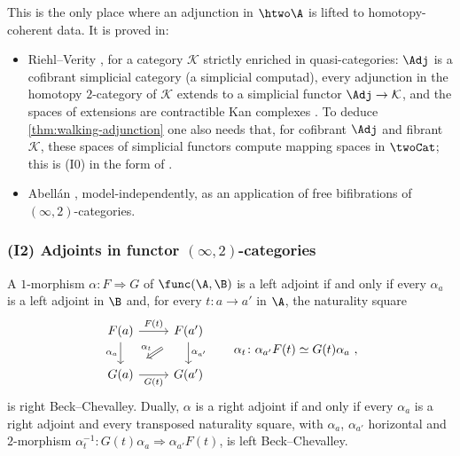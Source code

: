 This is the only place where an adjunction in $\htwo\A$ is lifted to homotopy-coherent data. It is proved in:
\begin{itemize}
\item Riehl--Verity \cite{riehlverity2016adjunctions}, for a category $\mathcal{K}$ strictly enriched in quasi-categories: $\Adj$ is a cofibrant simplicial category (a simplicial computad), every adjunction in the homotopy $2$-category of $\mathcal{K}$ extends to a simplicial functor $\Adj \to \mathcal{K}$, and the spaces of extensions are contractible Kan complexes \cite[\S 4]{riehlverity2016adjunctions}.
To deduce \cref{thm:walking-adjunction} one also needs that, for cofibrant $\Adj$ and fibrant $\mathcal{K}$, these spaces of simplicial functors compute mapping spaces in $\twoCat$; this is (I0) in the form of \cite{haugseng2015rectification}.
\item Abell\'an \cite{abellan2026bifibrations}, model-independently, as an application of free bifibrations of $(\infty,2)$-categories. 
\end{itemize}

\subsubsection*{(I2) Adjoints in functor $(\infty,2)$-categories}
\begin{thm}
\label{thm:adjoints-in-functor-cats}
A $1$-morphism $\alpha\colon F \Rightarrow G$ of $\func(\A,\B)$ is a left adjoint if and only if every $\alpha_{a}$ is a left adjoint in $\B$ and, for every $t\colon a \to a'$ in $\A$, the naturality square
\[
\begin{tikzcd}
F(a) \ar[r, "F(t)"] \ar[d, "\alpha_{a}"'] & F(a') \ar[d, "\alpha_{a'}"] \ar[dl, Rightarrow, shorten=3mm, "\alpha_{t}"'] \\
G(a) \ar[r, "G(t)"'] & G(a')
\end{tikzcd}
\qquad \alpha_{t}\colon \alpha_{a'}F(t) \simeq G(t)\alpha_{a} \ ,
\]
is right Beck--Chevalley.
Dually, $\alpha$ is a right adjoint if and only if every $\alpha_{a}$ is a right adjoint and every transposed naturality square, with $\alpha_{a}$, $\alpha_{a'}$ horizontal and $2$-morphism $\alpha_{t}^{-1}\colon G(t)\alpha_{a} \Rightarrow \alpha_{a'}F(t)$, is left Beck--Chevalley.
\end{thm}

